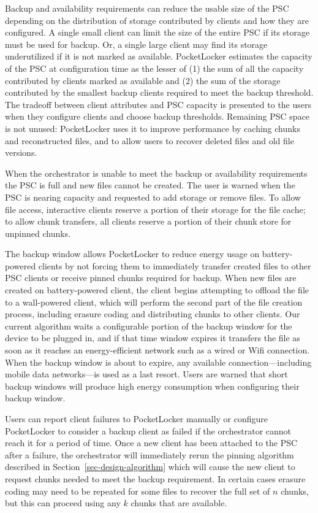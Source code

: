 Backup and availability requirements can reduce the usable size of the PSC
depending on the distribution of storage contributed by clients and how they
are configured. A single small client can limit the size of the
entire PSC if its storage must be used for backup. Or, a single large client
may find its storage underutilized if it is not marked as available.
PocketLocker estimates the capacity of the PSC at configuration time as the
lesser of (1) the sum of all the capacity contributed by clients marked as
available and (2) the sum of the storage contributed by the smallest backup
clients required to meet the backup threshold. The tradeoff between client
attributes and PSC capacity is presented to the users when they configure
clients and choose backup thresholds. Remaining PSC space is not unused:
PocketLocker uses it to improve performance by caching chunks and
reconstructed files, and to allow users to recover deleted files and old file
versions.

When the orchestrator is unable to meet the backup or availability
requirements the PSC is full and new files cannot be created. The user is
warned when the PSC is nearing capacity and requested to add storage or
remove files. To allow file access, interactive clients reserve a portion of
their storage for the file cache; to allow chunk transfers, all clients
reserve a portion of their chunk store for unpinned chunks.

The backup window allows PocketLocker to reduce energy usage on
battery-powered clients by not forcing them to immediately transfer created
files to other PSC clients or receive pinned chunks required for backup. When
new files are created on battery-powered client, the client begins attempting
to offload the file to a wall-powered client, which will perform the second
part of the file creation process, including erasure coding and distributing
chunks to other clients. Our current algorithm waits a configurable portion
of the backup window for the device to be plugged in, and if that time window
expires it transfers the file as soon as it reaches an energy-efficient
network such as a wired or Wifi connection. When the backup window is about
to expire, any available connection---including mobile data networks---is used
as a last resort. Users are warned that short backup windows will produce
high energy consumption when configuring their backup window.

Users can report client failures to PocketLocker manually or configure
PocketLocker to consider a backup client as failed if the orchestrator cannot
reach it for a period of time. Once a new client has been attached to the PSC
after a failure, the orchestrator will immediately rerun the pinning
algorithm described in Section~\ref{sec-design-algorithm} which will cause
the new client to request chunks needed to meet the backup requirement. In
certain cases erasure coding may need to be repeated for some files to
recover the full set of $n$ chunks, but this can proceed using any $k$ chunks
that are available.

